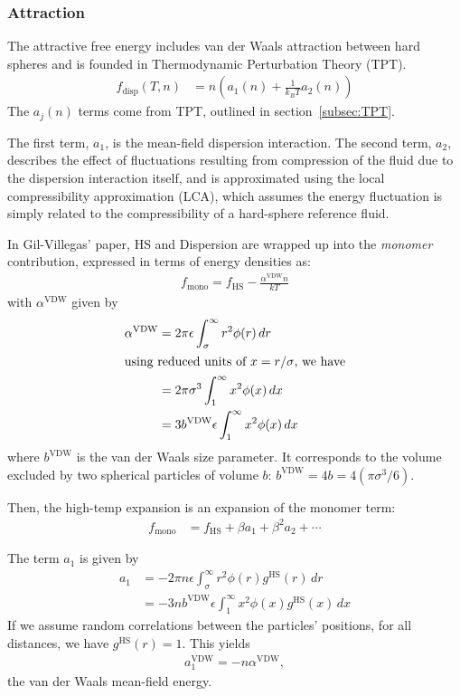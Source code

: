 \documentclass[letterpaper,twocolumn,amsmath,amssymb,prb]{revtex4-1}
\newcommand{\kT}{\ensuremath{k_BT}}
\newcommand{\fdisp}{\ensuremath{f_\text{disp}(T,n)}}
\newcommand{\1}{\ensuremath{\textbf{r}_1}}
\newcommand{\2}{\ensuremath{\textbf{r}_2}}
\newcommand{\3}{\ensuremath{\textbf{r}_3}}
\newcommand{\4}{\ensuremath{\textbf{r}_4}}
\begin{document}
\subsubsection{Attraction}\label{sub2sec:disp}
The attractive free energy includes van der Waals attraction between
hard spheres and is founded in Thermodynamic Perturbation Theory
(TPT).
\begin{align}
  \fdisp &= n \left( a_1(n) + \frac{1}{\kT}a_2(n) \right)
\end{align}
The $a_j(n)$ terms come from TPT, outlined in section~\ref{subsec:TPT}.

The first term, $a_1$, is the mean-field dispersion interaction. The
second term, $a_2$, describes the effect of fluctuations resulting
from compression of the fluid due to the dispersion interaction
itself, and is approximated using the local compressibility
approximation (LCA), which assumes the energy fluctuation is simply
related to the compressibility of a hard-sphere reference
fluid.\cite{Barker76}

In Gil-Villegas' paper,\cite{gil-villegas97} HS and Dispersion are wrapped up into the
\textit{monomer} contribution, expressed in terms of energy densities
as:
\begin{align}
  f_\text{mono} = f_\text{HS} - \frac{\alpha^\text{VDW}n}{kT}
\end{align}
with $\alpha^\text{VDW}$ given by
\begin{align}
  \alpha^\text{VDW} &= 2\pi\epsilon\int_\sigma^\infty r^2\phi(r)\,dr \\
  \intertext{using reduced units of $x = r/\sigma$, we have}
  &= 2\pi\sigma^3\int_1^\infty x^2\phi(x)\,dx \\
  &= 3b^\text{VDW}\epsilon\int_1^\infty x^2\phi(x)\,dx
\end{align}
where $b^\text{VDW}$ is the van der Waals size parameter. It
corresponds to the volume excluded by two spherical particles of
volume $b$: $b^\text{VDW} = 4b = 4\left(\pi\sigma^3/6\right)$.

Then, the high-temp expansion is an expansion of the monomer term:
\begin{align}
  f_\text{mono} &= f_\text{HS} + \beta a_1 + \beta^2 a_2 + \cdots
\end{align}

The term $a_1$ is given by
\begin{align}
  a_1 &= -2\pi n \epsilon\int_\sigma^\infty r^2\phi(r)g^\text{HS}(r)\,dr \\
  &= -3 n  b^\text{VDW}\epsilon\int_1^\infty x^2\phi(x)g^\text{HS}(x)\,dx
\end{align}
If we assume random correlations between the particles' positions, for
all distances, we have $g^\text{HS}(r) = 1$. This yields
\begin{align}
  a_1^\text{VDW} = - n \alpha^\text{VDW},
\end{align}
the van der Waals mean-field energy.
\end{document}
